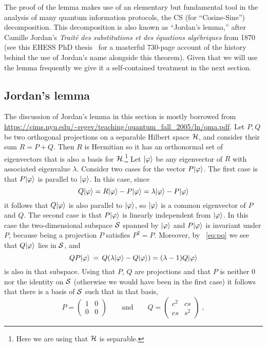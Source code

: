 The proof of the lemma makes use of an elementary but fundamental tool in the analysis of many quantum information protocols, the CS (for ``Cosine-Sine'') decomposition. This decomposition is also known as ``Jordan's lemma,'' after Camille Jordan's \emph{Traité des substitutions et des équations algébriques} from 1870 (see this EHESS PhD thesis~\cite{brechenmacher2006histoire} for a masterful 730-page account of the history behind the use of Jordan's name alongside this theorem). Given that we will use the lemma frequently we give it a self-contained treatment in the next section. 

\subsection{Jordan's lemma}

The discussion of Jordan's lemma in this section is mostly borrowed from \url{https://cims.nyu.edu/~regev/teaching/quantum_fall_2005/ln/qma.pdf}. Let $P,Q$ be two orthogonal projections on a separable Hilbert space $\mathcal{H}$, and consider their sum $R=P+Q$. Then $R$ is Hermitian so it has an orthonormal set of eigenvectors that is also a basis for $\mathcal{H}$.\footnote{Here we are using that $\mathcal{H}$ is separable.} Let $|\varphi\rangle$ be  any eigenvector of $R$ with associated eigenvalue $\lambda$. Consider two cases for the vector $P|\varphi\rangle$. The first case is that $P|\varphi\rangle$ is parallel to $|\varphi\rangle$. In this case, since
\begin{equation}\label{eq:pq}
Q|\varphi\rangle = R|\varphi\rangle - P|\varphi\rangle = \lambda |\varphi\rangle - P |\varphi\rangle
\end{equation}
it follows that $Q|\varphi\rangle$ is also parallel to $|\varphi\rangle$, so $|\varphi\rangle$ is a common eigenvector of $P$ and $Q$. The second case is that $P|\varphi\rangle$ is linearly independent from $|\varphi\rangle$. In this case the two-dimensional subspace $\mathcal{S}$ spanned by $|\varphi\rangle$ and $P|\varphi\rangle$ is invariant under $P$, because being a projection $P$ satisfies $P^2=P$. Moreover, by
~\eqref{eq:pq} we see that $Q|\varphi\rangle$ lies in $\mathcal{S}$, and  
\[ Q P |\varphi\rangle \,=\, Q (\lambda |\varphi\rangle  - Q |\varphi\rangle) = (\lambda-1)Q |\varphi\rangle\]
is also in that subspace. Using that $P$, $Q$ are projections and that $P$ is neither $0$ nor the identity on $\mathcal{S}$ (otherwise we would have been in the first case) it follows that there is a basis of $\mathcal{S}$ such that in that basis, 
\begin{equation}\label{eq:pq-form}
 P = \begin{pmatrix} 1 & 0 \\ 0 & 0 \end{pmatrix} \qquad \text{and} \qquad Q = \begin{pmatrix} c^2 & cs \\ cs & s^2 \end{pmatrix}\;,
\end{equation}

